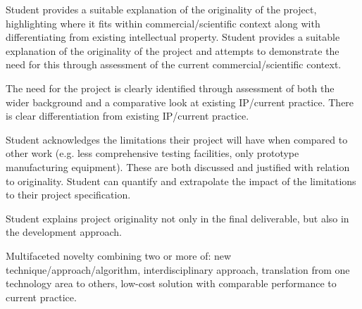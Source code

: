 Student provides a suitable explanation of the originality of the project, highlighting where it fits within commercial/scientific context along with differentiating from existing intellectual property.
Student provides a suitable explanation of the originality of the project and attempts to demonstrate the need for this through assessment of the current commercial/scientific context.

The need for the project is clearly identified through assessment of both the wider background and a comparative look at existing IP/current practice. There is clear differentiation from existing IP/current practice.

Student acknowledges the limitations their project will have when compared to other work (e.g. less comprehensive testing facilities, only prototype manufacturing equipment). These are both discussed and justified with relation to originality. Student can quantify and extrapolate the impact of the limitations to their project specification.

Student explains project originality not only in the final deliverable, but also in the development approach.

Multifaceted novelty combining two or more of: new technique/approach/algorithm, interdisciplinary approach, translation from one technology area to others, low-cost solution with comparable performance to current practice.